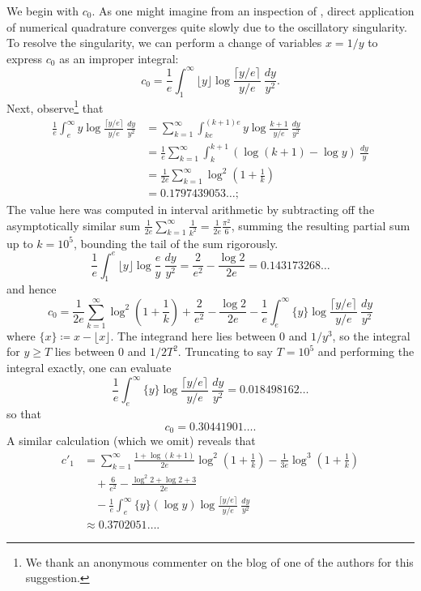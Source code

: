 \documentclass[12pt,a4paper,reqno]{amsart}
\numberwithin{equation}{section}
\theoremstyle{plain}
\theoremstyle{definition}
\begin{document}
We begin with $c_0$.  As one might imagine from an inspection of , direct application of numerical quadrature converges quite slowly due to the oscillatory singularity.  To resolve the singularity, we can perform a change of variables $x=1/y$ to express $c_0$ as an improper integral:
\begin{equation}\label{c0-alt}
   c_0 = \frac{1}{e} \int_1^\infty \lfloor y \rfloor \log \frac{\lceil y/e \rceil}{y/e}\ \frac{dy}{y^2}.
\end{equation}
Next, observe\footnote{We thank an anonymous commenter on the blog of one of the authors for this suggestion.} that
\begin{align*}
  \frac{1}{e} \int_e^\infty y \log \frac{\lceil y/e \rceil}{y/e}\ \frac{dy}{y^2}
  &= \sum_{k=1}^\infty \int_{ke}^{(k+1)e} y \log \frac{k+1}{y/e}\ \frac{dy}{y^2} \\
  &= \frac{1}{e} \sum_{k=1}^\infty \int_k^{k+1} \left(\log(k+1)-\log y\right)\ \frac{dy}{y}\\
  &= \frac{1}{2e} \sum_{k=1}^\infty \log^2 \left(1 + \frac{1}{k}\right)\\
  &= 0.1797439053\dots;
\end{align*}
The value here was computed in interval arithmetic by subtracting off the asymptotically similar sum $\frac{1}{2e} \sum_{k=1}^\infty \frac{1}{k^2} = \frac{1}{2e} \frac{\pi^2}{6}$, summing the resulting partial sum up to $k=10^5$, bounding the tail of the sum rigorously.
$$ \frac{1}{e} \int_1^e \lfloor y \rfloor \log \frac{e}{y}\ \frac{dy}{y^2} = \frac{2}{e^2} - \frac{\log 2}{2e} = 0.143173268\dots$$
and hence
$$ c_0 = \frac{1}{2e} \sum_{k=1}^\infty \log^2 \left(1 + \frac{1}{k}\right)
+ \frac{2}{e^2} - \frac{\log 2}{2e} - \frac{1}{e} \int_e^\infty \{y\} \log \frac{\lceil y/e \rceil}{y/e}\ \frac{dy}{y^2}$$
where $\{x\} \coloneqq x - \lfloor x \rfloor$.  The integrand here lies between $0$ and $1/y^3$, so the integral for $y \geq T$ lies between $0$ and $1/2T^2$.  Truncating to say $T = 10^5$ and performing the integral exactly, one can evaluate
$$ \frac{1}{e} \int_e^\infty \{y\} \log \frac{\lceil y/e \rceil}{y/e}\ \frac{dy}{y^2} = 0.018498162\dots$$
so that
$$ c_0 = 0.30441901\dots.$$
A similar calculation (which we omit) reveals that
\begin{align*}
  c'_1 &= \sum_{k=1}^\infty \frac{1+\log(k+1)}{2e}  \log^2\left(1+\frac{1}{k}\right) - \frac{1}{3e} \log^3\left(1+\frac{1}{k}\right)  \\
  &\quad + \frac{6}{e^2} - \frac{\log^2 2 + \log 2 + 3}{2e}\\
 &\quad - \frac{1}{e} \int_e^\infty \{y\} (\log y) \log \frac{\lceil y/e \rceil}{y/e}\ \frac{dy}{y^2} \\
 &\approx 0.3702051\dots.
\end{align*}
\end{document}
